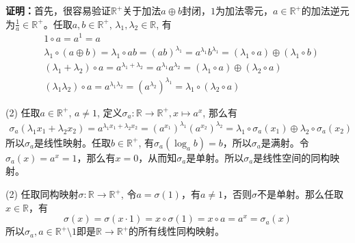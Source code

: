 {\bf 证明：}首先，很容易验证$\mathbb{R}^+$关于加法$a\oplus b$封闭，$1$为加法零元，$a\in\mathbb{R}^+$的加法逆元为$\frac{1}{a}\in\mathbb{R}^+$。任取$a,b\in\mathbb{R}^+$, $\lambda_1,\lambda_2\in\mathbb{R}$, 有
\begin{align*}
& 1\circ a = a^1 = a \\
& \lambda_1 \circ (a\oplus b) = \lambda_1 \circ ab = (ab)^{\lambda_1} = a^{\lambda_1} b^{\lambda_1} = (\lambda_1\circ a) \oplus (\lambda_1\circ b) \\
& (\lambda_1 + \lambda_2) \circ a = a^{\lambda_1 + \lambda_2} = a^{\lambda_1} a^{\lambda_2} = (\lambda_1 \circ a) \oplus (\lambda_2 \circ a) \\
& (\lambda_1\lambda_2)\circ a = a^{\lambda_1\lambda_2} = (a^{\lambda_2})^{\lambda_1} = \lambda_1 \circ (\lambda_2 \circ a)
\end{align*}

(2) 任取$a\in\mathbb{R}^{+}$, $a \neq 1$, 定义$\sigma_a: \mathbb{R} \to \mathbb{R}^{+}, x \mapsto a^x$, 那么有
\begin{align*}
\sigma_a(\lambda_1x_1 + \lambda_2x_2) = a^{\lambda_1x_1 + \lambda_2x_2} = (a^{x_1})^{\lambda_1} (a^{x_2})^{\lambda_2} = \lambda_1\circ \sigma_a(x_1) \oplus \lambda_2\circ \sigma_a(x_2)
\end{align*}
所以$\sigma_a$是线性映射。任取$b\in\mathbb{R}^{+}$, 有$\sigma_a(\log_a b) = b$，所以$\sigma_a$是满射。令$\sigma_a(x) = a^x = 1$，那么有$x = 0$，从而知$\sigma_a$是单射。所以$\sigma_a$是线性空间的同构映射。

(2) 任取同构映射$\sigma: \mathbb{R} \to \mathbb{R}^{+}$, 令$a = \sigma(1)$，有$a\neq 1$，否则$\sigma$不是单射。那么任取$x\in\mathbb{R}$，有
$$\sigma(x) = \sigma(x\cdot 1) = x \circ \sigma(1) = x \circ a = a^{x} = \sigma_a(x)$$
所以$\sigma_a, a\in\mathbb{R}^{+} \setminus {1}$即是$\mathbb{R} \to \mathbb{R}^{+}$的所有线性同构映射。



